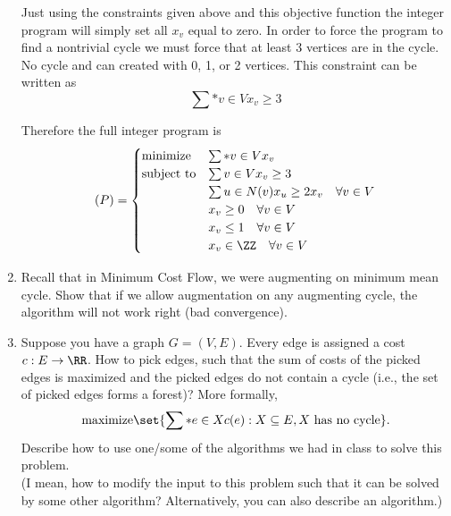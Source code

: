 \documentclass[11pt, oneside]{article}
\begin{document}
\begin{enumerate}
    Just using the constraints given above and this objective function the
    integer program will simply set all $x_v$ equal to zero.
    In order to force the program to find a nontrivial cycle we must force that
    at least 3 vertices are in the cycle.
    No cycle and can created with 0, 1, or 2 vertices.
    This constraint can be written as
    \[
      \sum*{v \in V}{}{x_v} \ge 3
    \]

    Therefore the full integer program is
    \[
      (P) =
      \begin{cases}
        \text{minimize}    & \sum*{v \in V}{}{x_v} \\
        \text{subject to}  & \sum{v \in V}{}{x_v} \ge 3 \\
                           & \sum{u \in N(v)}{}{x_u} \ge 2x_v \quad \forall v \in V \\
                           & x_v \ge 0 \quad \forall v \in V \\
                           & x_v \le 1 \quad \forall v \in V \\
                           & x_v \in \ZZ \quad \forall v \in V \\
      \end{cases}
    \]

  \item %
    Recall that in Minimum Cost Flow, we were augmenting on minimum mean cycle.
    Show that if we allow augmentation on any augmenting cycle, the algorithm
    will not work right (bad convergence).

  \item %
    Suppose you have a graph $G=(V,E)$.
    Every edge is assigned a cost $c: E \rightarrow \RR$.
    How to pick edges, such that the sum of costs of the picked edges is maximized
    and the picked edges do not contain a cycle (i.e., the set of picked
    edges forms a forest)?
    More formally, 
    \[
      \text{maximize} \set{\sum*{e \in X}{}{c(e)}:  X \subseteq E, X \text{ has no cycle}}.
    \]
    Describe how to use one/some of the algorithms we had in class to solve this problem.\\
    (I mean, how to modify the input to this problem such that it can be solved by some other algorithm?
    Alternatively, you can also describe an algorithm.)


\end{enumerate}
\end{document}
